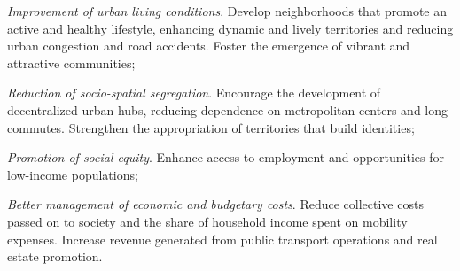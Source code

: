 \begin{refsegment}
\begin{customitemize}
\item \textsl{Improvement of urban living conditions}. Develop neighborhoods that promote an active and healthy lifestyle, enhancing dynamic and lively territories and reducing urban congestion and road accidents. Foster the emergence of vibrant and attractive communities;
\item \textsl{Reduction of socio-spatial segregation}. Encourage the development of decentralized urban hubs, reducing dependence on metropolitan centers and long commutes. Strengthen the appropriation of territories that build identities;
\item \textsl{Promotion of social equity}. Enhance access to employment and opportunities for low-income populations;
\item \textsl{Better management of economic and budgetary costs}. Reduce collective costs passed on to society and the share of household income spent on mobility expenses. Increase revenue generated from public transport operations and real estate promotion.
    \end{customitemize}%


\end{refsegment}
